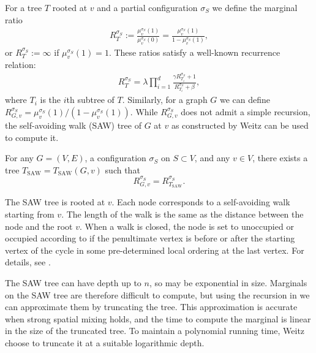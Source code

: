 \documentclass{theoretics}
\newcommand{\defeq}{:=}
\newcommand{\TSAW}{T_{\mathrm{SAW}}}
\begin{document}
For a tree $T$ rooted at $v$ and a partial configuration $\sigma_S$ we define the marginal ratio
\begin{align*}
  R_T^{\sigma_S}\defeq\frac{\mu_v^{\sigma_S}(1)}{\mu_v^{\sigma_S}(0)}=\frac{\mu_v^{\sigma_S}(1)}{1-\mu_v^{\sigma_S}(1)},
\end{align*}
or $R_T^{\sigma_S}\defeq\infty$ if $\mu_v^{\sigma_S}(1)=1$.
These ratios satisfy a well-known recurrence relation:
\begin{align}
\label{saw-recursion}
R_T^{\sigma_S}=\lambda\prod_{i=1}^d\frac{\gamma R_{T_i}^{\sigma_S}+1}{R_{T_i}^{\sigma_S}+\beta},
\end{align}
where $T_i$ is the $i$th subtree of $T$. Similarly, for a graph $G$ we can define $R_{G,v}^{\sigma_S}=\mu_v^{\sigma_S}(1)/(1-\mu_v^{\sigma_S}(1))$.
While $R_{G,v}^{\sigma_S}$ does not admit a simple recursion, the self-avoiding walk (SAW) tree of $G$ at $v$ as constructed by Weitz \cite{Wei06} can be used to compute it. 

\begin{theorem}
\label{saw-theorem}
For any $G=(V,E)$, a configuration $\sigma_S$ on $S\subset V$, and any $v\in V$, there exists a tree $\TSAW=\TSAW(G,v)$ such that
\[R_{G,v}^{\sigma_S}=R_{\TSAW}^{\sigma_S}.\]
\end{theorem}

The SAW tree is rooted at $v$.
Each node corresponds to a self-avoiding walk starting from $v$. The length of the walk is the same as the distance between the node and the root $v$.
When a walk is closed, the node is set to unoccupied or occupied according to if the penultimate vertex is before or after the starting vertex of the cycle in some pre-determined local ordering at the last vertex.
For details, see \cite{Wei06}.

The SAW tree can have depth up to $n$, so may be exponential in size. Marginals on the SAW tree are therefore difficult to compute, but using the recursion in  we can approximate them by truncating the tree. 
This approximation is accurate when strong spatial mixing holds,
and the time to compute the marginal is linear in the size of the truncated tree.
To maintain a polynomial running time, Weitz~\cite{Wei06} choose to truncate it at a suitable logarithmic depth.

\end{document}
